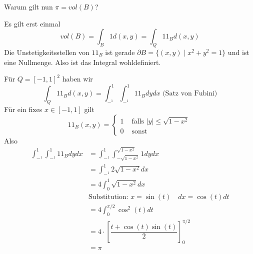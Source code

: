 \documentclass[main.tex]{subfiles}
\begin{document}
\begin{Beispiel}[$B(0,1) = B = \{(x,y) \in \R^2 \mid x^2 + y^2 \leq 1\}$]
  Warum gilt nun $\pi = vol(B)$?

  Es gilt erst einmal
  $$vol(B) = \int_B 1 d(x,y) = \int_Q 1\!\!1_B d(x,y)$$
  Die Unstetigkeitsstellen von $1\!\!1_B$ ist gerade $\partial B = \{(x,y)\mid x^2 + y^2 = 1\}$ und ist eine Nullmenge. Also ist das Integral wohldefiniert.

  Für $Q = [-1,1]^2$ haben wir
  $$\int_Q 1\!\!1_B d(x,y) = \int_{-^1}^1 \int_{-^1}^1 1\!\!1_B dy dx \text{ (Satz von Fubini)}$$
  Für ein fixes $x \in [-1,1]$ gilt
  $$1\!\!1_B(x,y) = \left\{\begin{aligned}
    1 & \text{ falls } |y| \leq \sqrt{1-x^2} \\
    0 & \text{ sonst}
  \end{aligned}\right.$$
  Also
  $$\begin{aligned}
    \int_{-^1}^1 \int_{-^1}^1 1\!\!1_B dy dx & = \int_{-^1}^1 \int_{-\sqrt{1 - x^2}}^{\sqrt{1 - x^2}} 1 dy dx \\
    & = \int_{-^1}^1 2 \sqrt{1 - x^2} dx \\
    & = 4 \int_0^1 \sqrt{1 - x^2} dx \\
    & \text{Substitution: } x = \sin(t) \quad dx = \cos(t) dt \\
    & = 4 \int_0^{\pi/2} \cos^2(t) dt \\
    & = 4 \cdot \left[\dfrac{t + \cos(t)\sin(t)}{2}\right]_0^{\pi/2} \\
    & = \pi
  \end{aligned}$$
\end{Beispiel}
\end{document}

